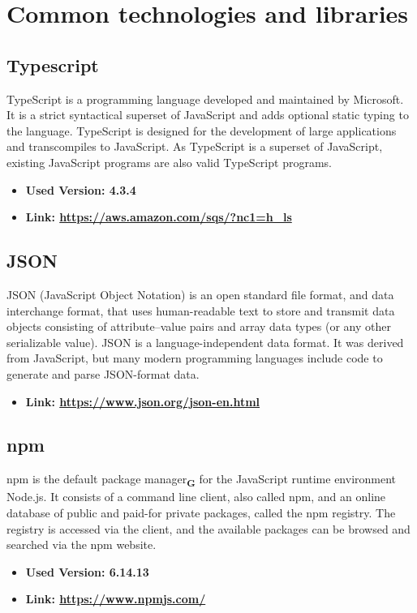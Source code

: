 \section{Common technologies and libraries}
\subsection{Typescript}
TypeScript is a programming language developed and maintained by Microsoft. It is a strict syntactical
superset of JavaScript and adds optional static typing to the language. TypeScript is designed for the
development of large applications and transcompiles to JavaScript. As TypeScript is a superset of JavaScript,
existing JavaScript programs are also valid TypeScript programs.
\begin{itemize}
  \item \textbf{Used Version: 4.3.4}
  \item \textbf{Link: \url{https://aws.amazon.com/sqs/?nc1=h_ls}}
\end{itemize}
\subsection{JSON}
JSON (JavaScript Object Notation) is an open standard file format, and data interchange format, that
uses human-readable text to store and transmit data objects consisting of attribute–value pairs and
array data types (or any other serializable value).
JSON is a language-independent data format. It was derived from JavaScript,
but many modern programming languages include code to generate and parse JSON-format data.
\begin{itemize}
  \item \textbf{Link: \url{https://www.json.org/json-en.html}}
\end{itemize}
\subsection{npm}
npm is the default package manager\textsubscript{\textbf{G}} for the JavaScript runtime environment Node.js.
It consists of a command line client, also called npm, and an online database of public and paid-for private packages,
called the npm registry. The registry is accessed via the client, and the available packages can be browsed and
searched via the npm website.
\begin{itemize}
  \item \textbf{Used Version: 6.14.13}
  \item \textbf{Link: \url{https://www.npmjs.com/}}
\end{itemize}
